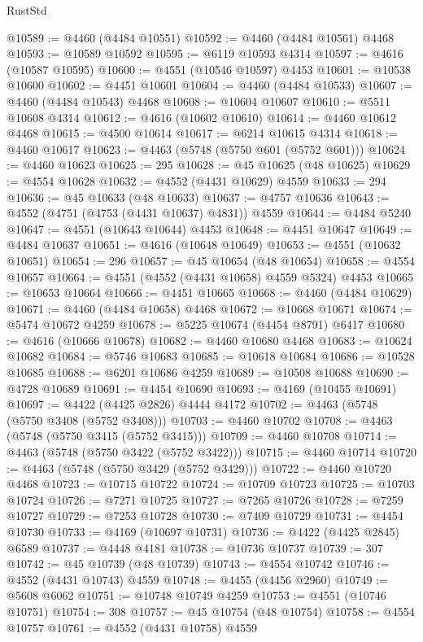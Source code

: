 \begin{lexlean}{RustStd}
\begin{coremodule}
@10589 := @4460 (@4484 @10551)
@10592 := @4460 (@4484 @10561) @4468
@10593 := @10589 @10592
@10595 := @6119 @10593 @4314
@10597 := @4616 (@10587 @10595)
@10600 := @4551 (@10546 @10597) @4453
@10601 := @10538 @10600
@10602 := @4451 @10601
@10604 := @4460 (@4484 @10533)
@10607 := @4460 (@4484 @10543) @4468
@10608 := @10604 @10607
@10610 := @5511 @10608 @4314
@10612 := @4616 (@10602 @10610)
@10614 := @4460 @10612 @4468
@10615 := @4500 @10614
@10617 := @6214 @10615 @4314
@10618 := @4460 @10617
@10623 := @4463 (@5748 (@5750 @601 (@5752 @601)))
@10624 := @4460 @10623
@10625 := 295
@10628 := @45 @10625 (@48 @10625)
@10629 := @4554 @10628
@10632 := @4552 (@4431 @10629) @4559
@10633 := 294
@10636 := @45 @10633 (@48 @10633)
@10637 := @4757 @10636
@10643 := @4552 (@4751 (@4753 (@4431 @10637) @4831)) @4559
@10644 := @4484 @5240
@10647 := @4551 (@10643 @10644) @4453
@10648 := @4451 @10647
@10649 := @4484 @10637
@10651 := @4616 (@10648 @10649)
@10653 := @4551 (@10632 @10651)
@10654 := 296
@10657 := @45 @10654 (@48 @10654)
@10658 := @4554 @10657
@10664 := @4551 (@4552 (@4431 @10658) @4559 @5324) @4453
@10665 := @10653 @10664
@10666 := @4451 @10665
@10668 := @4460 (@4484 @10629)
@10671 := @4460 (@4484 @10658) @4468
@10672 := @10668 @10671
@10674 := @5474 @10672 @4259
@10678 := @5225 @10674 (@4454 @8791) @6417
@10680 := @4616 (@10666 @10678)
@10682 := @4460 @10680 @4468
@10683 := @10624 @10682
@10684 := @5746 @10683
@10685 := @10618 @10684
@10686 := @10528 @10685
@10688 := @6201 @10686 @4259
@10689 := @10508 @10688
@10690 := @4728 @10689
@10691 := @4454 @10690
@10693 := @4169 (@10455 @10691)
@10697 := @4422 (@4425 @2826) @4444 @4172
@10702 := @4463 (@5748 (@5750 @3408 (@5752 @3408)))
@10703 := @4460 @10702
@10708 := @4463 (@5748 (@5750 @3415 (@5752 @3415)))
@10709 := @4460 @10708
@10714 := @4463 (@5748 (@5750 @3422 (@5752 @3422)))
@10715 := @4460 @10714
@10720 := @4463 (@5748 (@5750 @3429 (@5752 @3429)))
@10722 := @4460 @10720 @4468
@10723 := @10715 @10722
@10724 := @10709 @10723
@10725 := @10703 @10724
@10726 := @7271 @10725
@10727 := @7265 @10726
@10728 := @7259 @10727
@10729 := @7253 @10728
@10730 := @7409 @10729
@10731 := @4454 @10730
@10733 := @4169 (@10697 @10731)
@10736 := @4422 (@4425 @2845) @6589
@10737 := @4448 @4181
@10738 := @10736 @10737
@10739 := 307
@10742 := @45 @10739 (@48 @10739)
@10743 := @4554 @10742
@10746 := @4552 (@4431 @10743) @4559
@10748 := @4455 (@4456 @2960)
@10749 := @5608 @6062
@10751 := @10748 @10749 @4259
@10753 := @4551 (@10746 @10751)
@10754 := 308
@10757 := @45 @10754 (@48 @10754)
@10758 := @4554 @10757
@10761 := @4552 (@4431 @10758) @4559

\end{coremodule}
\end{lexlean}
